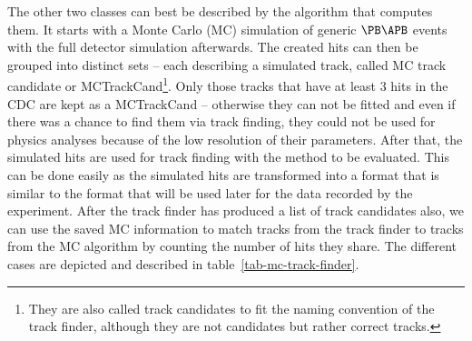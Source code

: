 The other two classes can best be described by the algorithm that computes them. It starts with a Monte Carlo (MC) simulation of generic $\PB\APB$ events with the full detector simulation afterwards. The created hits can then be grouped into distinct sets -- each describing a simulated track, called MC track candidate or MCTrackCand\footnote{They are also called track candidates to fit the naming convention of the track finder, although they are not candidates but rather correct tracks.}. Only those tracks that have at least 3 hits in the CDC are kept as a MCTrackCand -- otherwise they can not be fitted and even if there was a chance to find them via track finding, they could not be used for physics analyses because of the low resolution of their parameters. After that, the simulated hits are used for track finding with the method to be evaluated. This can be done easily as the simulated hits are transformed into a format that is similar to the format that will be used later for the data recorded by the experiment. After the track finder has produced a list of track candidates also, we can use the saved MC information to match tracks from the track finder to tracks from the MC algorithm by counting the number of hits they share. The different cases are depicted and described in table~\ref{tab-mc-track-finder}.

